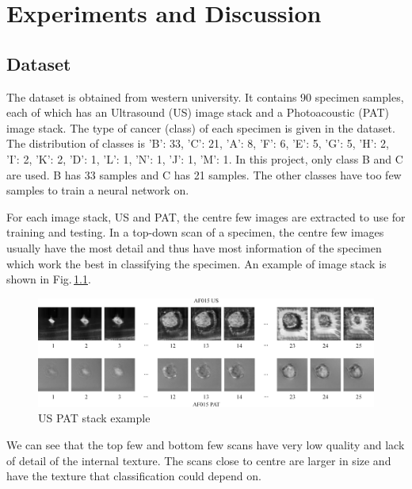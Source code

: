 \chapter{Experiments and Discussion} 

\section{Dataset}
The dataset is obtained from western university. It contains 90 specimen samples, each of which has an Ultrasound (US) image stack and a Photoacoustic (PAT) image stack. The type of cancer (class) of each specimen is given in the dataset. The distribution of classes is 
{'B': 33, 'C': 21, 'A': 8, 'F': 6, 'E': 5, 'G': 5, 'H': 2, 'I': 2, 'K': 2, 'D': 1, 'L': 1, 'N': 1, 'J': 1, 'M': 1}.  
In this project, only class B and C are used. B has 33 samples and C has 21 samples. The other classes have too few samples to train a neural network on. 

For each image stack, US and PAT, the centre few images are extracted to use for training and testing. In a top-down scan of a specimen, the centre few images usually have the most detail and thus have most information of the specimen which work the best in classifying the specimen. An example of image stack is shown in Fig.\,\ref{stack}.

\begin{figure}[h]
	\centering
	\includegraphics[width=\textwidth]{Figs/stack.jpg}
    \caption{US PAT stack example}
    \label{stack}
\end{figure}

We can see that the top few and bottom few scans have very low quality and lack of detail of the internal texture. The scans close to centre are larger in size and have the texture that classification could depend on.


